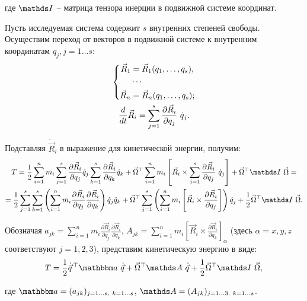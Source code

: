 \vlevo где $\bbI$ -- матрица тензора инерции в подвижной системе координат.

Пусть исследуемая система содержит $s$ внутренних степеней свободы. Осуществим переход от векторов в подвижной системе к внутренним координатам $q_j, j=1 \dots s$:
\vverh
\begin{gather}
\left\{
\begin{aligned}
\vec{R}_1 &= \vec{R}_1 (q_1, \dots, q_s), \\
&\cdots \\
\vec{R}_n &= \vec{R}_n (q_1, \dots, q_s);
\end{aligned}
\right. \notag \\
\frac{d}{dt} \vec{R}_i = \sum_{j=1}^{s} \frac{\partial \vec{R}_i}{\partial q_j} \ \dot{q}_j \notag .
\end{gather}

Подставляя $\dot{\vec{R}}_i$ в выражение для кинетической энергии, получим:
\vverh
\begin{gather}
T = \frac{1}{2} \sum_{i=1}^{n} m_i \sum_{j=1}^{s} \frac{\partial \vec{R}_i}{\partial q_j} \dot{q}_j \sum_{k=1}^{s} \frac{\partial \vec{R}_i}{\partial q_k} \dot{q}_k + \vec{\Omega}^\top \sum_{i=1}^{n} m_i \left[ \vec{R}_i \times \sum_{j=1}^{s} \frac{\partial \vec{R}_i}{\partial q_j} \ \dot{q}_j \right] + \vec{\Omega}^\top \bbI \ \vec{\Omega} = \notag \\
= \frac{1}{2} \sum_{j=1}^{s} \sum_{k=1}^{s} \left( \sum_{i=1}^{n} m_i \frac{\partial \vec{R}_i}{\partial q_j} \frac{\partial \vec{R}_i}{\partial q_k} \right) \dot{q}_j \dot{q}_k + \vec{\Omega}^\top \sum_{j=1}^{s} \left( \sum_{i=1}^{n} m_i \left[ \vec{R}_i \times \frac{\partial \vec{R}_i}{\partial q_j} \right] \right) \dot{q}_j + \frac{1}{2} \vec{\Omega}^\top \bbI \ \vec{\Omega} \notag .
\end{gather}

Обозначая $a_{jk} = \sum_{i=1}^{n} m_i \frac{\partial \vec{R}_i}{\partial q_j} \frac{\partial \vec{R}_i}{\partial q_k}$, $A_{jk} = \sum_{i=1}^{n} m_i \left[ \vec{R}_i \times \frac{\partial \vec{R}_i}{\partial q_k} \right]_{\alpha}$ (здесь $\alpha = x,y,z$ соответствуют $j=1,2,3$), представим кинетическую энергию в виде:
\vverh
\begin{gather}
T = \frac{1}{2} \dot{\vec{q}}^{\, \top} \bba \ \dot{\vec{q}} + \vec{\Omega}^\top \bbA \ \dot{\vec{q}} + \frac{1}{2} \vec{\Omega}^\top \bbI \ \vec{\Omega} \notag ,
\end{gather}

\vlevo где $\bba = (a_{jk})_{j=1 \dots s, \ k=1 \dots s}$, $\bbA = (A_{jk})_{j=1 \dots 3, \ k=1 \dots s}$.

